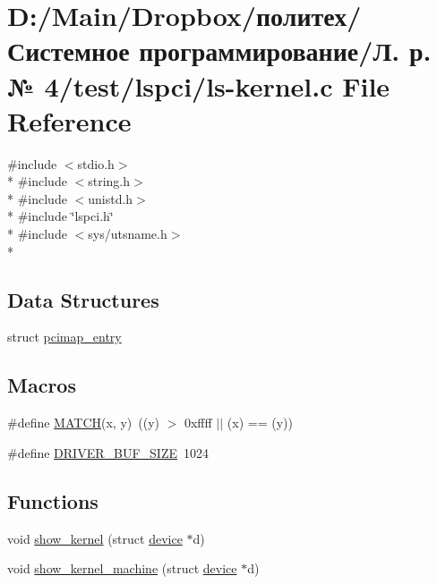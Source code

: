 \hypertarget{ls-kernel_8c}{}\section{D\+:/\+Main/\+Dropbox/политех/Системное программирование/Л. р. № 4/test/lspci/ls-\/kernel.c File Reference}
\label{ls-kernel_8c}
{\ttfamily \#include $<$stdio.\+h$>$}\\*
{\ttfamily \#include $<$string.\+h$>$}\\*
{\ttfamily \#include $<$unistd.\+h$>$}\\*
{\ttfamily \#include \char`\"{}lspci.\+h\char`\"{}}\\*
{\ttfamily \#include $<$sys/utsname.\+h$>$}\\*
\subsection*{Data Structures}
\begin{DoxyCompactItemize}
\item 
struct \hyperlink{structpcimap__entry}{pcimap\+\_\+entry}
\end{DoxyCompactItemize}
\subsection*{Macros}
\begin{DoxyCompactItemize}
\item 
\#define \hyperlink{ls-kernel_8c_af9e439a2473063fe6a8ccbf3271fbcf4}{M\+A\+T\+CH}(x,  y)~((y) $>$ 0xffff $\vert$$\vert$ (x) == (y))
\item 
\#define \hyperlink{ls-kernel_8c_a04dd2d5f2c00bffc289b0c8e2dbdbe56}{D\+R\+I\+V\+E\+R\+\_\+\+B\+U\+F\+\_\+\+S\+I\+ZE}~1024
\end{DoxyCompactItemize}
\subsection*{Functions}
\begin{DoxyCompactItemize}
\item 
void \hyperlink{ls-kernel_8c_a6d99437958bce75f4843547f8a2d97f1}{show\+\_\+kernel} (struct \hyperlink{structdevice}{device} $\ast$d)
\item 
void \hyperlink{ls-kernel_8c_a715d3b5c9a053e644d1ec34b55b13333}{show\+\_\+kernel\+\_\+machine} (struct \hyperlink{structdevice}{device} $\ast$d)
\end{DoxyCompactItemize}



